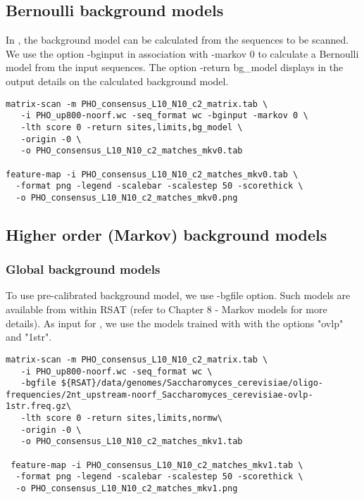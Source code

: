 \subsection{Bernoulli background models}
In , the background model can be calculated from the sequences to be scanned.
We use the option -bginput in association with -markov 0 to calculate a Bernoulli model from the input sequences.
The option -return bg\_model displays in the output details on the calculated background model.

{\color{Blue} \begin{footnotesize} 
\begin{verbatim}
matrix-scan -m PHO_consensus_L10_N10_c2_matrix.tab \
   -i PHO_up800-noorf.wc -seq_format wc -bginput -markov 0 \
   -lth score 0 -return sites,limits,bg_model \
   -origin -0 \
   -o PHO_consensus_L10_N10_c2_matches_mkv0.tab

feature-map -i PHO_consensus_L10_N10_c2_matches_mkv0.tab \
  -format png -legend -scalebar -scalestep 50 -scorethick \
  -o PHO_consensus_L10_N10_c2_matches_mkv0.png 

\end{verbatim} \end{footnotesize}
}

\subsection{Higher order (Markov) background models}

\subsubsection{Global background models}
To use pre-calibrated background model, we use -bgfile option. Such models are available from within RSAT (refer to Chapter 8 - Markov models for more details). As input for , we use the models trained with  with the options "ovlp" and "1str". 

{\color{Blue} \begin{footnotesize} 
\begin{verbatim}
matrix-scan -m PHO_consensus_L10_N10_c2_matrix.tab \
   -i PHO_up800-noorf.wc -seq_format wc \
   -bgfile ${RSAT}/data/genomes/Saccharomyces_cerevisiae/oligo-frequencies/2nt_upstream-noorf_Saccharomyces_cerevisiae-ovlp-1str.freq.gz\
   -lth score 0 -return sites,limits,normw\
   -origin -0 \
   -o PHO_consensus_L10_N10_c2_matches_mkv1.tab
 
 feature-map -i PHO_consensus_L10_N10_c2_matches_mkv1.tab \
  -format png -legend -scalebar -scalestep 50 -scorethick \
  -o PHO_consensus_L10_N10_c2_matches_mkv1.png 
\end{verbatim} \end{footnotesize}
}

